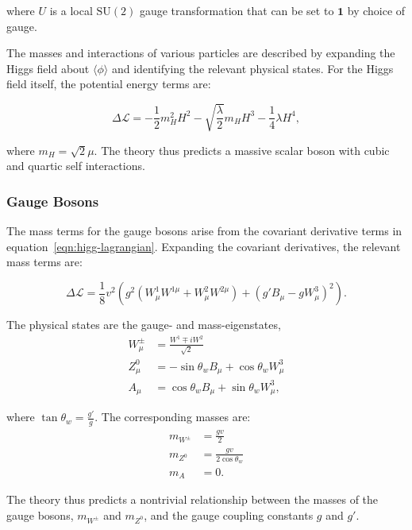 where $U$ is a local $\mathrm{SU}(2)$ gauge transformation that can be set to $\mathbf{1}$ by choice of gauge. 

The masses and interactions of various particles are described by expanding the Higgs field about $\langle \phi \rangle$ and identifying the relevant physical states. For the Higgs field itself, the potential energy terms are:

\begin{equation}
	\Delta \mathcal{L} = -\frac12 m_H^2 H^2 - \sqrt{\frac{\lambda}{2}} m_H H^3 - \frac14 \lambda H^4,
\end{equation}

 where $m_H=\sqrt{2}\mu$. The theory thus predicts a massive scalar boson with cubic and quartic self interactions.


\subsubsection{Gauge Bosons}
The mass terms for the gauge bosons arise from the covariant derivative terms in equation~\ref{eqn:higg-lagrangian}. Expanding the covariant derivatives, the relevant mass terms are:

\begin{equation}
	\Delta\mathcal{L} = \frac{1}{8} v^2 \left( g^2 (W^1_{\mu}W^{1\mu} + W^2_{\mu}W^{2\mu}) + (g'B_{\mu} - gW^3_{\mu})^2 \right).
\end{equation}

The physical states are the gauge- and mass-eigenstates,
\begin{align}
	W^{\pm}_{\mu} &= \frac{W^1 \mp iW^2}{\sqrt{2}} \label{eqn:weak-diag-W} \\
	Z^0_{\mu} &= -\sin\theta_w B_{\mu} + \cos\theta_w W_{\mu}^3 \label{eqn:weak-diag-Z}\\
	A_{\mu} &= \cos\theta_w B_{\mu} + \sin\theta_w W_{\mu}^3\label{eqn:weak-diag-A},
\end{align}

where $\tan\theta_w = \frac{g'}{g}$. The corresponding masses are:
\begin{align}
	m_{W^{\pm}} &= \frac{gv}{2} \\
	m_{Z^0} &= \frac{gv}{2\cos\theta_w} \\
	m_{A} &= 0.
\end{align}

The theory thus predicts a nontrivial relationship between the masses of the gauge bosons, $m_{W^{\pm}}$ and $m_{Z^0}$, and the gauge coupling constants $g$ and $g'$.

